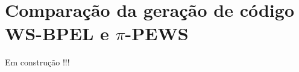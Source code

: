 %
%
\section{Comparação da geração de código WS-BPEL e $\pi$-PEWS}%
\label{cdn}


Em construção !!!

